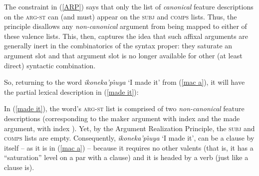 \documentclass[output=paper
	        ,collection
	        ,collectionchapter
 	        ,biblatex
                ,babelshorthands
                ,newtxmath
                ,draftmode
                ,colorlinks, citecolor=brown
]{langscibook}
\begin{document}
%
The constraint in (\ref{ARP}) says that only the list of \textit{canonical} feature descriptions on the \textsc{arg-st} can (and must) appear on the \textsc{subj} and \textsc{comps} lists. Thus, the principle disallows any \textit{non-canonical} argument from being mapped to either of these valence lists. This, then, captures the idea that such affixal arguments are generally inert in the combinatorics of the syntax proper: they saturate an argument slot and that argument slot is no longer available for other (at least direct) syntactic combination. 

So, returning to the  word \textit{ikoneka'p\^{\i}uya} `I made it' from (\ref{mac a}), it will have the partial lexical description in (\ref{made it}):
% 
\begin{exe}
\ex \label{made it}
\end{exe}
%
In (\ref{made it}), the word's \textsc{arg-st} list is comprised of two \textit{non-canonical} feature descriptions (corresponding to the maker argument with index  and the made argument, with index ). Yet, by the Argument Realization Principle, the \textsc{subj} and \textsc{comps} lists are empty. Consequently, \textit{ikoneka'p\^{\i}uya} `I made it', can be a clause by itself -- as it is in (\ref{mac a}) -- because it requires no other valents (that is, it has a ``saturation'' level on a par with a clause) and it is headed by a verb (just like a clause is). 
\end{document}
